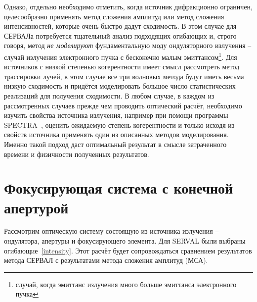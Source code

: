 Однако, отдельно необходимо отметить, когда источник дифракционно ограничен, целесообразно применять метод сложения амплитуд или метод сложения интенсивностей, которые очень быстро дадут сходимость. В этом случае для СЕРВАЛа потребуется тщательный анализ подходящих огибающих и, строго говоря, метод \textit{не моделируют} фундаментальную моду ондуляторного излучения -- случай излучения электронного пучка с бесконечно малым эмиттансом\footnote{случай, когда эмиттанс излучения много больше эмиттанса электронного пучка}. Для источников с низкой степенью когерентности имеет смысл рассмотреть метод трассировки лучей, в этом случае все три волновых метода будут иметь весьма низкую сходимость и придётся моделировать большое число статистических реализаций для получения сходимости. В любом случае, в каждом из рассмотренных случаев прежде чем проводить оптический расчёт, необходимо изучить свойства источника излучения, например при помощи программы SPECTRA~\cite{tanaka_spectra_2001}, оценить ожидаемую степень когерентности и только исходя из свойств источника применять один из описанных методов моделирования. Именно такой подход даст оптимальный результат в смысле затраченного времени и физичности полученных результатов. 

\section{Фокусирующая система с конечной апертурой}\label{section:focusing_system_with_aperture}
Рассмотрим оптическую систему состоящую из источника излучения -- ондулятора, апертуры и фокусирующего элемента. Для SERVAL были выбраны огибающие~\ref{intensity}. Этот расчёт будет сопровождаться сравнением результатов метода СЕРВАЛ с результатами метода сложения амплитуд (МСА).

